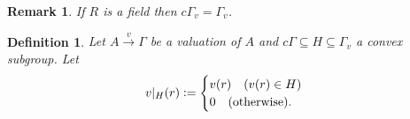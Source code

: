 \documentclass[8pt]{article}
\numberwithin{equation}{section}
\newtheorem{definition}{Definition}[subsection]
\newtheorem{remark}{Remark}[subsection]
\newcommand{\defeq}{\vcentcolon=}
\newcommand{\cGamma}[0]{c\Gamma}
\begin{document}

\begin{remark}
    If $R$ is a field then $\cGamma_v=\Gamma_v$.
\end{remark}

\begin{definition}
    \label{definition_7_10}
    Let $A\stackrel{v}{\to}\Gamma$ be a valuation of $A$ and $\cGamma\subseteq H\subseteq\Gamma_v$ a convex subgroup. Let 
    \begin{equation*}
        v|_{H}(r)\defeq\begin{cases}
            v(r)\quad(v(r)\in H)\\
            0\quad(\text{otherwise}).
        \end{cases}
    \end{equation*}
\end{definition}
\end{document}

